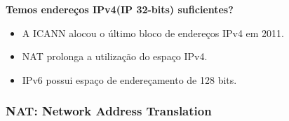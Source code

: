             \textbf{Temos endereços IPv4(IP 32-bits) suficientes?}
            \begin{itemize}[left=0.5cm, align=left, nosep]
                \item A ICANN alocou o último bloco de endereços IPv4 em 2011.
                \item NAT prolonga a utilização do espaço IPv4.
                \item IPv6 possui espaço de endereçamento de 128 bits.
            \end{itemize}
    
        \subsubsection*{NAT: Network Address Translation}

